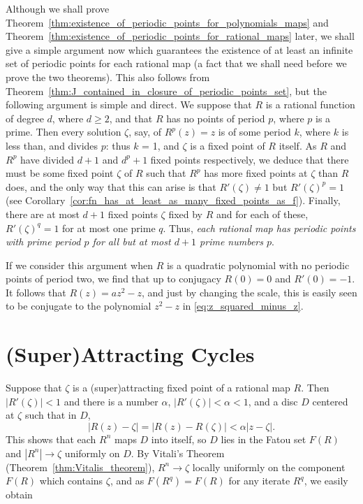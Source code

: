 \begin{remark}
    Although we shall prove
    Theorem~\ref{thm:existence_of_periodic_points_for_polynomials_maps} and
    Theorem~\ref{thm:existence_of_periodic_points_for_rational_maps} later, we
    shall give a simple argument now which guarantees the existence of at least
    an infinite set of periodic points for each rational map (a fact that we
    shall need before we prove the two theorems). This also follows from
    Theorem~\ref{thm:J_contained_in_closure_of_periodic_points_set}, but the
    following argument is simple and direct. We suppose that $R$ is a rational
    function of degree $d$, where $d \geq 2$, and that $R$ has no points of
    period $p$, where $p$ is a prime. Then every solution $\zeta$, say, of
    $R^p(z) = z$ is of some period $k$, where $k$ is less than, and divides $p$:
    thus $k$ = 1, and $\zeta$ is a fixed point of $R$ itself. As $R$ and $R^p$
    have divided $d + 1$ and $d^p + 1$ fixed points respectively, we deduce that
    there must be some fixed point $\zeta$ of $R$ such that $R^p$ has more fixed
    points at $\zeta$ than $R$ does, and the only way that this can arise is
    that $R'(\zeta) \neq 1$ but $R'(\zeta)^p = 1$ (see
    Corollary~\ref{cor:fn_has_at_least_as_many_fixed_points_as_f}). Finally,
    there are at most $d + 1$ fixed points $\zeta$ fixed by $R$ and for each of
    these, $R'(\zeta)^q = 1$ for at most one prime $q$. Thus, \emph{each
    rational map has periodic points with prime period $p$ for all but at most
    $d + 1$ prime numbers $p$}.
\end{remark}

If we consider this argument when $R$ is a quadratic polynomial with no periodic
points of period two, we find that up to conjugacy $R(0) = 0$ and $R'(0) = -1$.
It follows that $R(z) = az^2 - z$, and just by changing the scale, this is
easily seen to be conjugate to the polynomial $z^2 - z$ in
\eqref{eq:z_squared_minus_z}.

\section{(Super)Attracting Cycles}
\label{sec:attracting_cycles}

Suppose that $\zeta$ is a (super)attracting fixed point of a rational map $R$.
Then $|R'(\zeta)| < 1$ and there is a number $\alpha$, $|R'(\zeta)| < \alpha <
1$, and a disc $D$ centered at $\zeta$ such that in $D$,
\begin{equation*}
    |R(z) - \zeta| = |R(z) - R(\zeta)| < \alpha |z - \zeta|.
\end{equation*}
This shows that each $R^n$ maps $D$ into itself, so $D$ lies in the Fatou set
$F(R)$ and $|R^n| \to \zeta$ uniformly on $D$. By Vitali's Theorem
(Theorem~\ref{thm:Vitalis_theorem}), $R^n \to \zeta$ locally uniformly on the
component $F(R)$ which contains $\zeta$, and as $F(R^q) = F(R)$ for any iterate
$R^q$, we easily obtain

